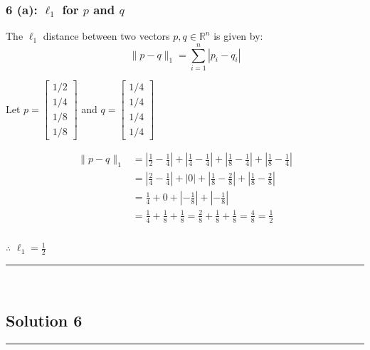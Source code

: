 \documentclass{article}
\begin{document}
\subsubsection*{6 (a): $\ell_1$ for $p$ and $q$}

\parbox{\textwidth}{The $\ell_1$ distance between two vectors $p, q \in \mathbb{R}^n$ is given by:
$$\|p-q\|_1 = \sum_{i=1}^n |p_i - q_i|$$

Let $p = \begin{bmatrix} 1/2 \\ 1/4 \\ 1/8 \\ 1/8 \end{bmatrix}$ and $q = \begin{bmatrix} 1/4 \\ 1/4 \\ 1/4 \\ 1/4 \end{bmatrix}$

\begin{align*}
    \|p-q\|_1 &= \left|\frac{1}{2} - \frac{1}{4}\right| + \left|\frac{1}{4} - \frac{1}{4}\right| + \left|\frac{1}{8} - \frac{1}{4}\right| + \left|\frac{1}{8} - \frac{1}{4}\right| \\
    &= \left|\frac{2}{4} - \frac{1}{4}\right| + |0| + \left|\frac{1}{8} - \frac{2}{8}\right| + \left|\frac{1}{8} - \frac{2}{8}\right| \\
    &= \frac{1}{4} + 0 + \left|-\frac{1}{8}\right| + \left|-\frac{1}{8}\right| \\
    &= \frac{1}{4} + \frac{1}{8} + \frac{1}{8} = \frac{2}{8} + \frac{1}{8} + \frac{1}{8} = \frac{4}{8} = \frac{1}{2}
\end{align*}
}
\subsubsection*{\normalfont}{$\therefore$ $\ell_{1}= \frac{1}{2}$}

\noindent\rule{\textwidth}{0.4pt}\\

\newpage

\subsection*{Solution 6}
\noindent\rule{\textwidth}{0.4pt}\\
\end{document}
